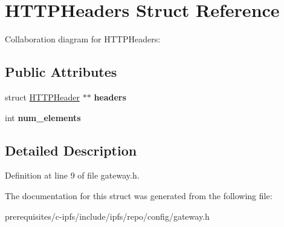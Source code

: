 \hypertarget{struct_h_t_t_p_headers}{}\section{H\+T\+T\+P\+Headers Struct Reference}
\label{struct_h_t_t_p_headers}


Collaboration diagram for H\+T\+T\+P\+Headers\+:
\subsection*{Public Attributes}
\begin{DoxyCompactItemize}
\item 
\mbox{\label{struct_h_t_t_p_headers_a81aac89626a53275e50f6d45f8be726c}} 
struct \mbox{\hyperlink{struct_h_t_t_p_header}{H\+T\+T\+P\+Header}} $\ast$$\ast$ {\bfseries headers}
\item 
\mbox{\label{struct_h_t_t_p_headers_a77f5ee0c3daf79cefc0e648b870a5974}} 
int {\bfseries num\+\_\+elements}
\end{DoxyCompactItemize}


\subsection{Detailed Description}


Definition at line 9 of file gateway.\+h.



The documentation for this struct was generated from the following file\+:\begin{DoxyCompactItemize}
\item 
prerequisites/c-\/ipfs/include/ipfs/repo/config/gateway.\+h\end{DoxyCompactItemize}
